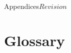 
\begin{cactuspart}{Appendices}{}{$Revision$}
\label{part:Appendices}
\renewcommand{\thepage}{\Alph{part}\arabic{page}}


\chapter{Glossary}
\label{sec:glossary}

\begin{Lentry}


\end{Lentry}
\end{cactuspart}
